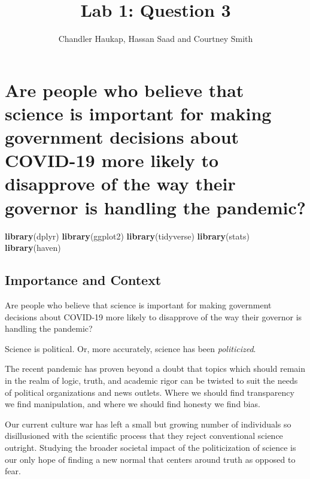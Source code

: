 \documentclass[
]{article}
\title{Lab 1: Question 3}
\author{Chandler Haukap, Hassan Saad and Courtney Smith}
\date{}
\newenvironment{Shaded}{\begin{snugshade}}{\end{snugshade}}
\newcommand{\KeywordTok}[1]{\textcolor[rgb]{0.13,0.29,0.53}{\textbf{#1}}}
\newcommand{\NormalTok}[1]{#1}
\begin{document}
\maketitle

\hypertarget{are-people-who-believe-that-science-is-important-for-making-government-decisions-about-covid-19-more-likely-to-disapprove-of-the-way-their-governor-is-handling-the-pandemic}{%
\section{Are people who believe that science is important for making
government decisions about COVID-19 more likely to disapprove of the way
their governor is handling the
pandemic?}\label{are-people-who-believe-that-science-is-important-for-making-government-decisions-about-covid-19-more-likely-to-disapprove-of-the-way-their-governor-is-handling-the-pandemic}}

\begin{Shaded}
\begin{Highlighting}[]
\KeywordTok{library}\NormalTok{(dplyr)}
\KeywordTok{library}\NormalTok{(ggplot2) }
\KeywordTok{library}\NormalTok{(tidyverse)}
\KeywordTok{library}\NormalTok{(stats)}
\KeywordTok{library}\NormalTok{(haven)}
\end{Highlighting}
\end{Shaded}

\hypertarget{importance-and-context}{%
\subsection{Importance and Context}\label{importance-and-context}}

Are people who believe that science is important for making government
decisions about COVID-19 more likely to disapprove of the way their
governor is handling the pandemic?

Science is political. Or, more accurately, science has been
\emph{politicized}.

The recent pandemic has proven beyond a doubt that topics which should
remain in the realm of logic, truth, and academic rigor can be twisted
to suit the needs of political organizations and news outlets. Where we
should find transparency we find manipulation, and where we should find
honesty we find bias.

Our current culture war has left a small but growing number of
individuals so disillusioned with the scientific process that they
reject conventional science outright. Studying the broader societal
impact of the politicization of science is our only hope of finding a
new normal that centers around truth as opposed to fear.
\end{document}
